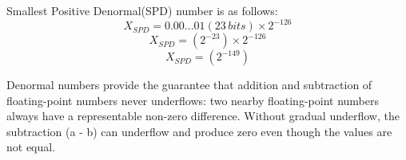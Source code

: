 \documentclass[12pt]{article}
\begin{document}
    Smallest Positive Denormal(SPD) number is as follows: 
    \begin{equation*}
        X_{SPD} = 0.00...01 (23 \, bits) \times 2^{-126}
    \end{equation*}
    \begin{equation*}
        X_{SPD} = (2^{-23}) \times 2^{-126}
    \end{equation*}
    \begin{equation*}
        X_{SPD} = (2^{-149})
    \end{equation*}
    
    Denormal numbers provide the guarantee that addition and subtraction of floating-point numbers never underflows: two nearby floating-point numbers always have a representable non-zero difference. Without gradual underflow, the subtraction (a - b) can underflow and produce zero even though the values are not equal.
\end{document}
